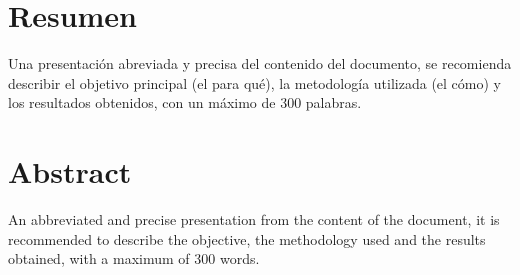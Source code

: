 \section*{Resumen}
\vspace{\baselineskip}
Una presentación abreviada y precisa del contenido del documento, se recomienda describir el objetivo principal (el para qué), la metodología utilizada (el cómo) y los resultados obtenidos, con un máximo de 300 palabras.
\newpage
{}
\section*{Abstract}
\vspace{\baselineskip}
An abbreviated and precise presentation from the content of the document, it is recommended to describe the objective, the methodology used and the results obtained, with a maximum of 300 words.
\newpage

